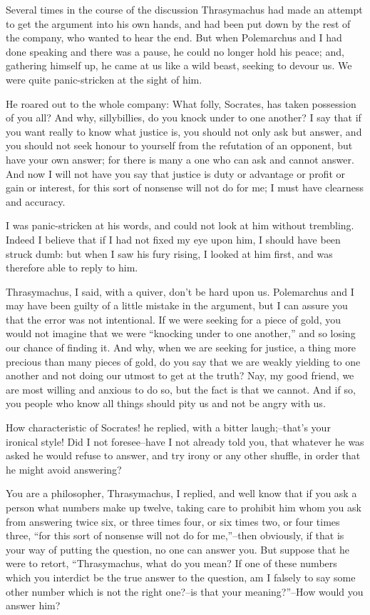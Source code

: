 Several times in the course of the discussion Thrasymachus had made an
attempt to get the argument into his own hands, and had been put down
by the rest of the company, who wanted to hear the end. But when
Polemarchus and I had done speaking and there was a pause, he could no
longer hold his peace; and, gathering himself up, he came at us like a
wild beast, seeking to devour us. We were quite panic-stricken at the
sight of him.

He roared out to the whole company: What folly, Socrates, has taken
possession of you all? And why, sillybillies, do you knock under to
one another? I say that if you want really to know what justice is,
you should not only ask but answer, and you should not seek honour to
yourself from the refutation of an opponent, but have your own answer;
for there is many a one who can ask and cannot answer. And now I will
not have you say that justice is duty or advantage or profit or gain
or interest, for this sort of nonsense will not do for me; I must have
clearness and accuracy.

I was panic-stricken at his words, and could not look at him without
trembling. Indeed I believe that if I had not fixed my eye upon him, I
should have been struck dumb: but when I saw his fury rising, I looked
at him first, and was therefore able to reply to him.

Thrasymachus, I said, with a quiver, don't be hard upon us. Polemarchus
and I may have been guilty of a little mistake in the argument, but I
can assure you that the error was not intentional. If we were seeking
for a piece of gold, you would not imagine that we were ``knocking under
to one another,'' and so losing our chance of finding it. And why, when
we are seeking for justice, a thing more precious than many pieces of
gold, do you say that we are weakly yielding to one another and not
doing our utmost to get at the truth? Nay, my good friend, we are most
willing and anxious to do so, but the fact is that we cannot. And if so,
you people who know all things should pity us and not be angry with us.

How characteristic of Socrates! he replied, with a bitter laugh;--that's
your ironical style! Did I not foresee--have I not already told you,
that whatever he was asked he would refuse to answer, and try irony or
any other shuffle, in order that he might avoid answering?

You are a philosopher, Thrasymachus, I replied, and well know that if
you ask a person what numbers make up twelve, taking care to prohibit
him whom you ask from answering twice six, or three times four, or six
times two, or four times three, ``for this sort of nonsense will not do
for me,''--then obviously, if that is your way of putting the
question, no one can answer you. But suppose that he were to retort,
``Thrasymachus, what do you mean? If one of these numbers which you
interdict be the true answer to the question, am I falsely to say some
other number which is not the right one?--is that your meaning?''--How
would you answer him?

